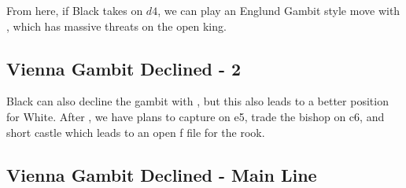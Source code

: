 \documentclass[12pt]{scrartcl}
\begin{document}
 From here, if Black takes on $d4$, we can play an Englund Gambit style move with , which has massive threats on the open king.

\subsection{Vienna Gambit Declined - 2}
\newgame
{}
Black can also decline the gambit with , but this also leads to a better position for White.  After , we have plans to capture on e5, trade the bishop on c6, and short castle which leads to an open f file for the rook.
\begin{center}
\showboard
\end{center}
\subsection{Vienna Gambit Declined - Main Line}
\end{document}
